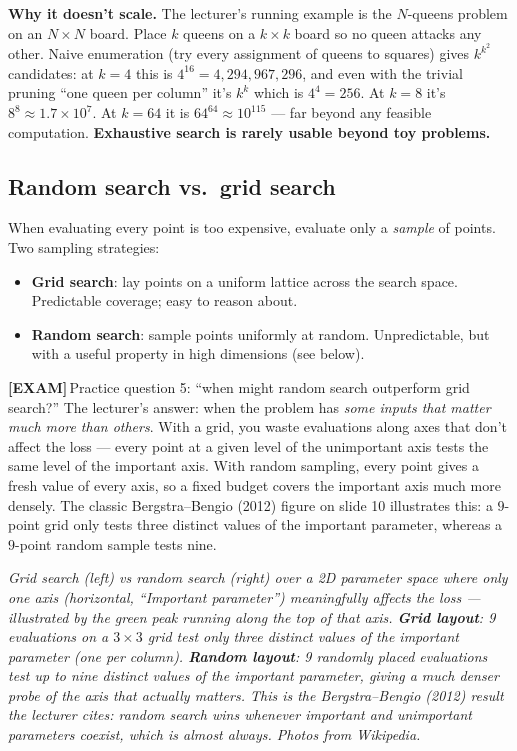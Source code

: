 \documentclass[11pt, a4paper]{article}
\newcommand{\examflag}{\textcolor{tipBd}{\textbf{[EXAM]}}\,}
\begin{document}
\textbf{Why it doesn't scale.} The lecturer's running example is the $N$-queens problem on an $N\times N$ board. Place $k$ queens on a $k \times k$ board so no queen attacks any other. Naive enumeration (try every assignment of queens to squares) gives $k^{k^2}$ candidates: at $k=4$ this is $4^{16} = 4{,}294{,}967{,}296$, and even with the trivial pruning ``one queen per column'' it's $k^k$ which is $4^4 = 256$. At $k=8$ it's $8^8 \approx 1.7\times 10^7$. At $k=64$ it is $64^{64}\!\approx\!10^{115}$ — far beyond any feasible computation. \textbf{Exhaustive search is rarely usable beyond toy problems.}

\subsection{Random search vs.\ grid search}

When evaluating every point is too expensive, evaluate only a \emph{sample} of points. Two sampling strategies:

\begin{itemize}
  \item \textbf{Grid search}: lay points on a uniform lattice across the search space. Predictable coverage; easy to reason about.
  \item \textbf{Random search}: sample points uniformly at random. Unpredictable, but with a useful property in high dimensions (see below).
\end{itemize}

\begin{notebox}
\examflag{}Practice question 5: ``when might random search outperform grid search?'' The lecturer's answer: when the problem has \emph{some inputs that matter much more than others}. With a grid, you waste evaluations along axes that don't affect the loss — every point at a given level of the unimportant axis tests the same level of the important axis. With random sampling, every point gives a fresh value of every axis, so a fixed budget covers the important axis much more densely. The classic Bergstra--Bengio (2012) figure on slide 10 illustrates this: a $9$-point grid only tests three distinct values of the important parameter, whereas a $9$-point random sample tests nine.
\end{notebox}

\begin{center}

\footnotesize\textit{Grid search (left) vs random search (right) over a 2D parameter space where only one axis (horizontal, ``Important parameter'') meaningfully affects the loss --- illustrated by the green peak running along the top of that axis. \textbf{Grid layout}: 9 evaluations on a $3\times3$ grid test only \emph{three} distinct values of the important parameter (one per column). \textbf{Random layout}: 9 randomly placed evaluations test up to \emph{nine} distinct values of the important parameter, giving a much denser probe of the axis that actually matters. This is the Bergstra--Bengio (2012) result the lecturer cites: random search wins whenever important and unimportant parameters coexist, which is almost always. \textit{Photos from Wikipedia.}}
\end{center}
\end{document}
